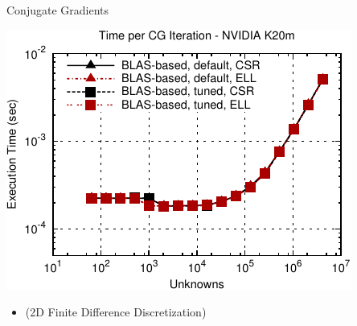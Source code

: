 \begin{frame}[fragile]{Conjugate Gradients}

 \begin{block}{}
 
 \begin{center}
  \vspace*{-0.5cm}
  \includegraphics[width=0.85\textwidth]{figures/cg-k20m-2}
 \end{center}

 \begin{itemize}
  \item   \vspace*{-0.3cm} {\small (2D Finite Difference Discretization)}
 \end{itemize}

 \end{block}
   
\end{frame}
